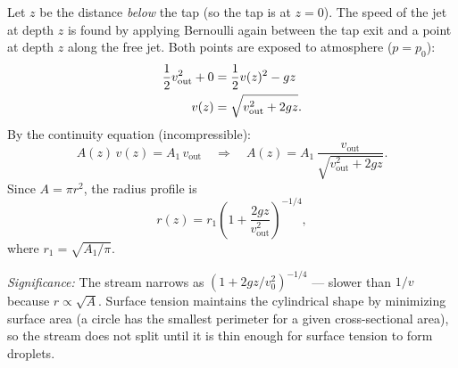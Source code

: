 \documentclass[../main.tex]{subfiles}
\begin{document}
Let $z$ be the distance \emph{below} the tap (so the tap is at $z=0$). The speed of the jet at depth $z$ is found by applying Bernoulli again between the tap exit and a point at depth $z$ along the free jet. Both points are exposed to atmosphere ($p=p_0$):
\begin{align}
  \frac{1}{2}v_{\mathrm{out}}^2 + 0 &= \frac{1}{2}v(z)^2 - gz \notag\\
  v(z) &= \sqrt{v_{\mathrm{out}}^2 + 2gz}.
  \label{eq:lec13_jet_speed}
\end{align}
By the continuity equation (incompressible):
\begin{equation}
  A(z)\,v(z) = A_1\,v_{\mathrm{out}}
  \quad\Longrightarrow\quad
  A(z) = A_1\,\frac{v_{\mathrm{out}}}{\sqrt{v_{\mathrm{out}}^2+2gz}}.
\end{equation}
Since $A=\pi r^2$, the radius profile is
\begin{equation}
  \boxed{r(z) = r_1\left(1+\frac{2gz}{v_{\mathrm{out}}^2}\right)^{-1/4},}
  \label{eq:lec13_stream_profile}
\end{equation}
where $r_1=\sqrt{A_1/\pi}$.

\begin{center}
\end{center}

\textit{Significance:} The stream narrows as $(1+2gz/v_0^2)^{-1/4}$ — slower than $1/v$ because $r\propto\sqrt{A}$. Surface tension maintains the cylindrical shape by minimizing surface area (a circle has the smallest perimeter for a given cross-sectional area), so the stream does not split until it is thin enough for surface tension to form droplets.

\end{document}
